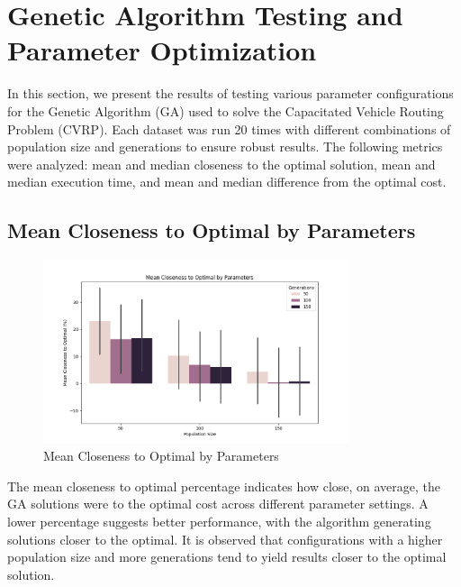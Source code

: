 \documentclass[
]{article}
\begin{document}
    \newpage


    \section{Genetic Algorithm Testing and Parameter Optimization}\label{sec:genetic-algorithm-testing-and-parameter-optimization}

    In this section, we present the results of testing various parameter configurations for the Genetic Algorithm (GA) used to solve the Capacitated Vehicle Routing Problem (CVRP). Each dataset was run 20 times with different combinations of population size and generations to ensure robust results. The following metrics were analyzed: mean and median closeness to the optimal solution, mean and median execution time, and mean and median difference from the optimal cost.

    \subsection{Mean Closeness to Optimal by Parameters}\label{subsec:mean-closeness-to-optimal-by-parameters}
    \begin{figure}[H]
        \centering
        \includegraphics[width=0.8\textwidth]{genetic_algorithm/mean_closeness_to_optimal.png}
        \caption{Mean Closeness to Optimal by Parameters}
        \label{fig:mean_closeness_to_optimal_ga}
    \end{figure}

    The mean closeness to optimal percentage indicates how close, on average, the GA solutions were to the optimal cost across different parameter settings. A lower percentage suggests better performance, with the algorithm generating solutions closer to the optimal. It is observed that configurations with a higher population size and more generations tend to yield results closer to the optimal solution.
\end{document}
